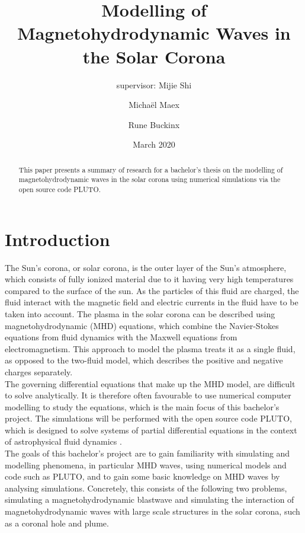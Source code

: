 \documentclass[a4paper]{article}
\title{Modelling of Magnetohydrodynamic Waves in the Solar Corona}
\author{supervisor: Mijie Shi \and Micha\"el Maex \and Rune Buckinx }
\date{March 2020}
\numberwithin{figure}{section}
\numberwithin{equation}{section}
\begin{document}
\maketitle

\begin{abstract}
    This paper presents a summary of research for a bachelor's thesis on the modelling of magnetohydrodynamic waves in the solar corona using numerical simulations via the open source code PLUTO. 
\end{abstract}
\newpage
\tableofcontents

\pagebreak

\listoffigures

\listoftodos

\newpage
{}
\section{Introduction} \label{sec:introduction}
The Sun's corona, or solar corona, is the outer layer of the Sun's atmosphere, which consists of fully ionized material due to it having very high temperatures compared to the surface of the sun. 
As the particles of this fluid are charged, the fluid interact with the magnetic field and electric currents in the fluid have to be taken into account.  
The plasma in the solar corona can be described using magnetohydrodynamic (MHD) equations, which combine the Navier-Stokes equations from fluid dynamics with the Maxwell equations from electromagnetism. 
This approach to model the plasma treats it as a single fluid, as opposed to the two-fluid model, which describes the positive and negative charges separately. \\

The governing differential equations that make up the MHD model, are difficult to solve analytically. 
It is therefore often favourable to use numerical computer modelling to study the equations, which is the main focus of this bachelor's project. 
The simulations will be performed with the open source code PLUTO, which is designed to solve systems of partial differential equations in the context of astrophysical fluid dynamics \cite{mignone2011pluto}.\\

The goals of this bachelor's project are to gain familiarity with simulating and modelling phenomena, in particular MHD waves, using numerical models and code such as PLUTO, and to gain some basic knowledge on MHD waves by analysing simulations. Concretely, this consists of the following two problems, simulating a magnetohydrodynamic blastwave and simulating the interaction of magnetohydrodynamic waves with large scale structures in the solar corona, such as a coronal hole and plume.
\end{document}
